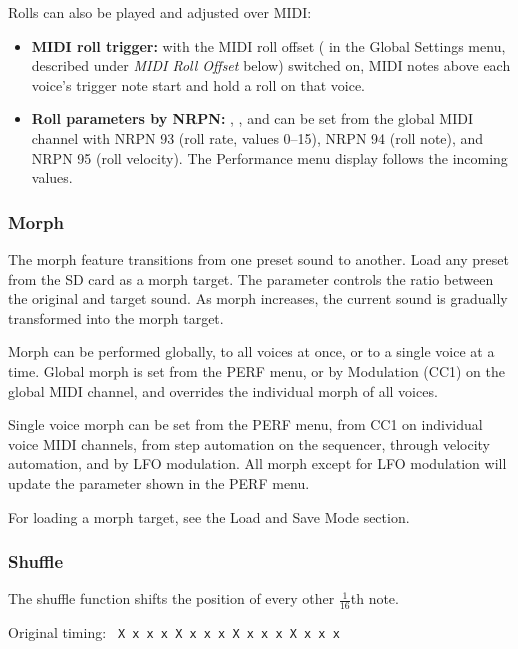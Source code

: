 Rolls can also be played and adjusted over MIDI:

\begin{itemize}
\tightlist
\item
  \textbf{MIDI roll trigger:} with the MIDI roll offset ( in
  the Global Settings menu, described under \emph{MIDI Roll Offset}
  below) switched on, MIDI notes above each voice's trigger note start
  and hold a roll on that voice.
\item
  \textbf{Roll parameters by NRPN:} , , and
   can be set from the global MIDI channel with NRPN 93 (roll
  rate, values 0--15), NRPN 94 (roll note), and NRPN 95 (roll velocity).
  The Performance menu display follows the incoming values.
\end{itemize}

\subsubsection{Morph}\label{morph}

The morph feature transitions from one preset sound to another. Load any
preset from the SD card as a morph target. The  parameter
controls the ratio between the original and target sound. As morph
increases, the current sound is gradually transformed into the morph
target.

Morph can be performed globally, to all voices at once, or to a single
voice at a time. Global morph is set from the PERF menu, or by
Modulation (CC1) on the global MIDI channel, and overrides the
individual morph of all voices.

Single voice morph can be set from the PERF menu, from CC1 on individual
voice MIDI channels, from step automation on the sequencer, through
velocity automation, and by LFO modulation. All morph except for LFO
modulation will update the parameter shown in the PERF menu.

For loading a morph target, see the Load and Save Mode section.

\subsubsection{Shuffle}\label{shuffle}

The shuffle function shifts the position of every other
\(\frac{1}{16}\)th note.

Original timing:
\texttt{\textbar{}\ X\ x\ x\ x\ X\ x\ x\ x\ X\ x\ x\ x\ X\ x\ x\ x\ \textbar{}}


